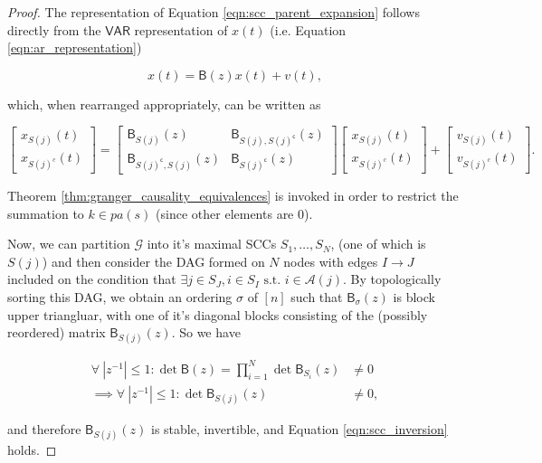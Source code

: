\documentclass{statsoc}
\def\gcg{\mathcal{G}}  %
\def\VAR{\mathsf{VAR}}  %
\def\B{\mathsf{B}}  %
\newcommand{\pa}[1]{pa(#1)}  %
\newcommand{\anc}[1]{\mathcal{A}(#1)}  %
\def\c{\mathsf{c}}  %
\begin{document}
\begin{proof}
  The representation of Equation \eqref{eqn:scc_parent_expansion}
  follows directly from the $\VAR$ representation of $x(t)$ (i.e. Equation
  \eqref{eqn:ar_representation})

  \[
    x(t) = \B(z)x(t) + v(t),
  \]

  which, when rearranged appropriately, can be written as

  \[
    \left[
      \begin{array}{c}
        x_{S(j)}(t)\\
        x_{S(j)^c}(t)
      \end{array}
    \right] =
    \left[
      \begin{array}{cc}
        \B_{S(j)}(z)& \B_{S(j), S(j)^\c}(z)\\
        \B_{S(j)^\c, S(j)}(z)& \B_{S(j)^\c}(z)
      \end{array}
    \right]
        \left[
      \begin{array}{c}
        x_{S(j)}(t)\\
        x_{S(j)^c}(t)
      \end{array}
    \right] +
    \left[
      \begin{array}{c}
        v_{S(j)}(t)\\
        v_{S(j)^c}(t)
      \end{array}
    \right].
  \]

  Theorem \ref{thm:granger_causality_equivalences} is invoked in order
  to restrict the summation to $k \in \pa{s}$ (since other elements
  are $0$).

  Now, we can partition $\gcg$ into it's maximal SCCs
  $S_1, \ldots, S_N$, (one of which is $S(j)$) and then consider the
  DAG formed on $N$ nodes with edges $I \rightarrow J$ included on the
  condition that
  $\exists j \in S_J, i \in S_I \text{ s.t. } i \in \anc{j}$.  By
  topologically sorting this DAG, we obtain an ordering $\sigma$ of
  $[n]$ such that $\B_\sigma(z)$ is block upper triangluar, with one
  of it's diagonal blocks consisting of the (possibly reordered)
  matrix $\B_{S(j)}(z)$.  So we have

  \begin{align*}
    \forall\ |z^{-1}| \le 1: \det \B(z) = \prod_{i = 1}^N \det \B_{S_i}(z) &\ne 0\\
    \implies \forall\ |z^{-1}| \le 1: \det \B_{S(j)}(z) &\ne 0,
  \end{align*}

  and therefore $\B_{S(j)}(z)$ is stable, invertible, and Equation
  \eqref{eqn:scc_inversion} holds.
\end{proof}
\end{document}
